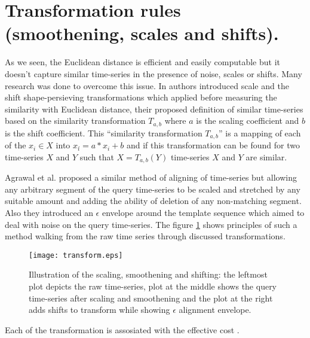 \section{Transformation rules (smoothening, scales and shifts).}
As we seen, the Euclidean distance is efficient and easily computable but it doesn't capture similar time-series in the presence of noise, scales or shifts. Many research was done to overcome this issue. In \cite{citeulike:3815880} authors introduced scale and the shift shape-persieving transformations which applied before measuring the similarity with Euclidean distance, their proposed definition of similar time-series based on the similarity transformation $T_{a,b}$ where $a$ is the scaling coefficient and $b$ is the shift coefficient. This ``similarity transformation $T_{a,b}$'' is a mapping of each of the $x_{i} \in X$ into $x_{i}\acute{} = a*x_{i}+b$ and if this transformation can be found for two time-series $X$ and $Y$ such that $X=T_{a,b}(Y)$ time-series $X$ and $Y$ are similar.

Agrawal et al. \cite{citeulike:3816327} proposed a similar method of aligning of time-series but allowing any arbitrary segment of the query time-series to be scaled and stretched by any suitable amount and adding the ability of deletion of any non-matching segment. Also they introduced an $\epsilon$ envelope around the template sequence which aimed to deal with noise on the query time-series. The figure  \ref{fig:transform} shows principles of such a method walking from the raw time series through discussed transformations.

\begin{figure}[tbp]
   \centering
   \texttt{[image: transform.eps]}
   \caption{Illustration of the scaling, smoothening and shifting: the leftmost plot depicts the raw time-series, plot at the middle shows the query time-series after scaling and smoothening and the plot at the right adds shifts to transform while showing $\epsilon$ alignment envelope.}
   \label{fig:transform}
\end{figure} 

Each of the transformation is assosiated with the effective cost .

